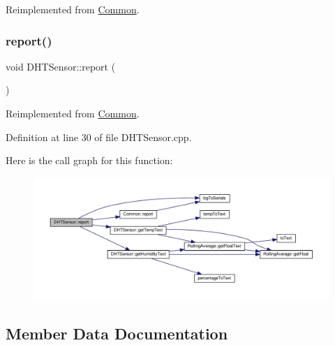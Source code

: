 Reimplemented from \hyperlink{class_common_a9e60e2c26a5f4d72342a59a969954636}{Common}.

\mbox{\label{class_d_h_t_sensor_a2ef11882c3401c097b7a08e4b35eb103}} 
\subsubsection{\texorpdfstring{report()}{report()}\hspace{0.1cm}{\footnotesize\ttfamily [2/2]}}
{\footnotesize\ttfamily void D\+H\+T\+Sensor\+::report (\begin{DoxyParamCaption}{ }\end{DoxyParamCaption})\hspace{0.3cm}{\ttfamily [virtual]}}



Reimplemented from \hyperlink{class_common_a9e60e2c26a5f4d72342a59a969954636}{Common}.



Definition at line 30 of file D\+H\+T\+Sensor.\+cpp.

Here is the call graph for this function\+:
\nopagebreak
\begin{figure}[H]
\begin{center}
\leavevmode
\includegraphics[width=350pt]{class_d_h_t_sensor_a2ef11882c3401c097b7a08e4b35eb103_cgraph}
\end{center}
\end{figure}


\subsection{Member Data Documentation}
\mbox{\label{class_d_h_t_sensor_a26b6663f5d7a7d698f05ecfa96e5589c}} 
